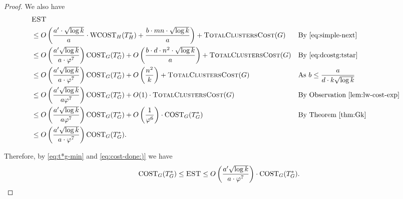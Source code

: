 \documentclass[letterpaper,11pt]{article}
\newcommand{\CT}{\text{COST}}
\newcommand{\wCT}{\text{WCOST}}
\newcommand{\estg}{\textsc{EST}}
\theoremstyle{plain}
\theoremstyle{definition}
\theoremstyle{remark}
\begin{document}
\begin{proof}
We also have
	\begin{align}
	\label{eq:cost-done:)}
	&\estg  \nonumber\\
	&\leq O\left(\frac{a' \cdot \sqrt{\log k}}{a}\cdot \wCT_{H}(T^*_{H}) + \frac{b\cdot mn \cdot \sqrt{\log k}}{a}  \right) + \textsc{TotalClustersCost}(G) &&\text{By  \eqref{eq:simple-next}} \nonumber\\
	&\leq O\left( \frac{a' \sqrt{\log k}}{a\cdot \varphi^{7}} \right) \CT_G(T^*_G)  + O\left(\frac{b\cdot d \cdot n^2 \cdot \sqrt{\log k}}{a}  \right) + \textsc{TotalClustersCost}(G) &&\text{By \eqref{eq:dcostg:tstar}} \nonumber\\
	&\leq O\left( \frac{a' \sqrt{\log k} }{a \cdot \varphi^{7}} \right) \CT_G(T^*_G) + O\left(\frac{n^2}{k}\right)+  \textsc{TotalClustersCost}(G) &&\text{As $b \leq \frac{a}{d \cdot k \sqrt{\log k}}$} \nonumber\\
	&\leq O\left( \frac{a' \sqrt{\log k}}{a \varphi^{7}} \right) \CT_G(T^*_G) + O(1)\cdot \textsc{TotalClustersCost}(G)  &&\text{By Observation \ref{lem:lw-cost-exp}}\nonumber\\
	&\leq O\left( \frac{a' \sqrt{\log k}}{a \varphi^{7}} \right) \CT_G(T^*_G)+ O\left(\frac{1}{\varphi^{6}}\right)\cdot \CT_G(T^*_G) &&\text{By Theorem \ref{thm:Gk}} \nonumber\\
	&\leq O\left( \frac{a' \sqrt{\log k}}{a \cdot \varphi^{7}} \right) \CT_G(T^*_G). 
	\end{align}

	Therefore, by \eqref{eq:t*g-min} and \eqref{eq:cost-done:)} we have
	\[\CT_G(T^*_G) \leq \estg \leq O\left( \frac{a' \sqrt{ \log k}}{a\cdot \varphi^7} \right)\cdot \CT_G(T^*_G) \text{.}\]

\end{proof}

\thmestdcost*
\end{document}

